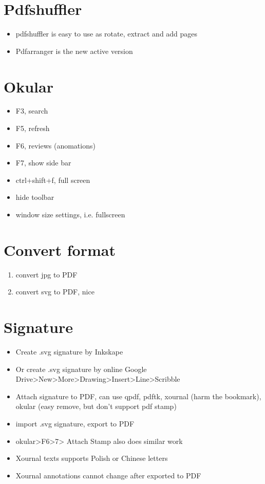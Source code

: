 \section{Pdfshuffler}
\begin{itemize}
\item pdfshuffler is easy to use as rotate, extract and add pages
\item Pdfarranger is the new active version
\end{itemize}

\section{Okular}
\begin{itemize}
\item F3, search
\item F5, refresh
\item F6, reviews (anomations)
\item F7, show side bar
\item ctrl+shift+f, full screen
\item {} hide toolbar
\item {} window size settings, i.e. fullscreen
\end{itemize}

\section{Convert format}
\begin{enumerate}
\item{} convert jpg to PDF
\item{} convert svg to PDF, nice
\end{enumerate}

\section{Signature}
\begin{itemize}
\item Create .svg signature by Inkskape
\item Or create .svg signature by online Google Drive>New>More>Drawing>Insert>Line>Scribble
\item Attach signature to PDF, can use qpdf, pdftk, xournal (harm the bookmark), okular (easy remove, but don't support pdf stamp)
\item {} import .svg signature, export to PDF
\item okular>F6>7> Attach Stamp also does similar work 
\item Xournal texts supports Polish or Chinese letters
\item Xournal annotations cannot change after exported to PDF
\end{itemize}

